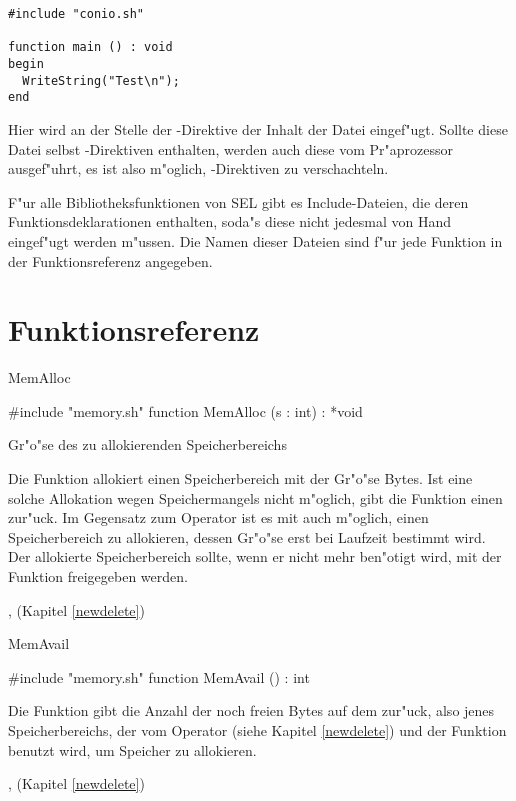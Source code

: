 \example
{}
\begin{verbatim}
#include "conio.sh"

function main () : void
begin
  WriteString("Test\n");
end
\end{verbatim}

Hier wird an der Stelle der -Direktive der Inhalt
der Datei  eingef"ugt. Sollte diese Datei selbst
-Direktiven enthalten, werden auch diese vom
Pr"aprozessor ausgef"uhrt, es ist also m"oglich,
-Direktiven zu verschachteln.

F"ur alle
Bibliotheksfunktionen von SEL gibt es Include-Dateien, die
deren Funktionsdeklarationen enthalten, soda"s diese nicht
jedesmal von Hand eingef"ugt werden m"ussen. Die Namen dieser
Dateien sind f"ur jede Funktion in der Funktionsreferenz
angegeben.

\chapter{Funktionsreferenz}
\label{funcref}


\begin{function}{MemAlloc}

\syntax
\#include "memory.sh"
function MemAlloc (s : int) : *void
\endgroup

\parameters
{} Gr"o"se des zu allokierenden Speicherbereichs \cr

\usage
Die Funktion  allokiert
einen Speicherbereich mit
der Gr"o"se  Bytes. Ist eine solche Allokation wegen
Speichermangels nicht m"oglich, gibt die Funktion einen
 zur"uck. Im Gegensatz zum Operator  ist es mit
 auch m"oglich, einen Speicherbereich zu allokieren,
dessen Gr"o"se erst bei Laufzeit bestimmt wird. Der allokierte
Speicherbereich sollte, wenn er nicht mehr ben"otigt wird, mit
der Funktion  freigegeben werden.

\fseealso
{},  (Kapitel \ref{newdelete})
\end{function}


\begin{function}{MemAvail}

\syntax
\#include "memory.sh"
function MemAvail () : int
\endgroup

\usage
Die Funktion  gibt die Anzahl der noch freien Bytes
auf dem  zur"uck, also jenes Speicherbereichs, der vom
Operator  (siehe Kapitel \ref{newdelete}) und der
Funktion  benutzt wird, um Speicher zu allokieren.

\fseealso
{},  (Kapitel \ref{newdelete})
\end{function}

